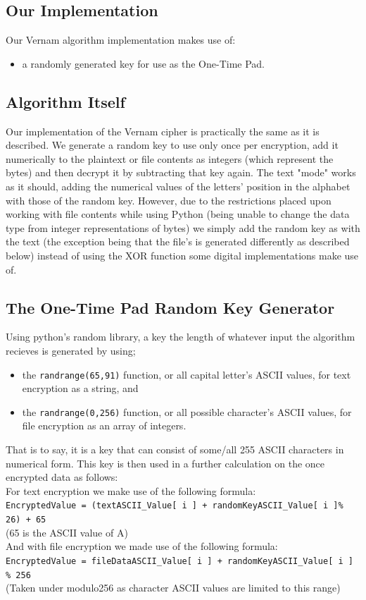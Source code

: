 \documentclass[a4paper, 12pt, titlepage]{report}
\begin{document}
\subsection{Our Implementation}
Our Vernam algorithm implementation makes use of:
\begin{itemize}
\item a randomly generated key for use as the One-Time Pad.
\end{itemize}
\subsection{Algorithm Itself}
Our implementation of the Vernam cipher is practically the same as it is described. We generate a random key to use only once per encryption, add it numerically to the plaintext or file contents as integers (which represent the bytes) and then decrypt it by subtracting that key again. The text "mode" works as it should, adding the numerical values of the letters' position in the alphabet with those of the random key. However, due to the restrictions placed upon working with file contents while using Python (being unable to change the data type from integer representations of bytes) we simply add the random key as with the text (the exception being that the file's is generated differently as described below) instead of using the XOR function some digital implementations make use of.
\subsection{The One-Time Pad Random Key Generator}
Using python's random library, a key the length of whatever input the algorithm recieves is generated by using;
\begin{itemize}
\item the \texttt{randrange(65,91)} function, or all capital letter's ASCII values, for text encryption as a string, and
\item the \texttt{randrange(0,256)} function, or all possible character's ASCII values, for file encryption as an array of integers.
\end{itemize}
That is to say, it is a key that can consist of some/all 255 ASCII characters in numerical form. This key is then used in a further calculation on the once encrypted data as follows:
\\
For text encryption we make use of the following formula:\\
\texttt{EncryptedValue = (textASCII\_Value[ i ] + randomKeyASCII\_Value[ i ]\% 26) + 65}\\
(65 is the ASCII value of A)\\
And with file encryption we made use of the following formula:\\
\texttt{EncryptedValue = fileDataASCII\_Value[ i ] + randomKeyASCII\_Value[ i ] \% 256}\\
(Taken under modulo256 as character ASCII values are limited to this range)
\end{document}
